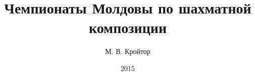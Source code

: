 \documentclass[12pt,a5paper]{book}
\title{Чемпионаты Молдовы по шахматной композиции}
\author{М. В. Кройтор}
\date{2015}
\begin{document}
\maketitle
\tableofcontents
\pagebreak















\end{document}

